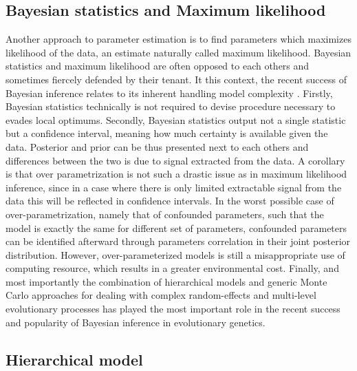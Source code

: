 \subsection{Bayesian statistics and {Maximum likelihood}}
Another approach to parameter estimation is to find parameters which maximizes likelihood of the data, an estimate naturally called maximum likelihood.
Bayesian statistics and maximum \gls{likelihood} are often opposed to each others and sometimes fiercely defended by their tenant.
It this context, the recent success of Bayesian inference relates to its inherent handling model complexity \citet{Lartillot2020}.
Firstly, Bayesian statistics technically is not required to devise procedure necessary to evades local optimums.
Secondly, Bayesian statistics output not a single statistic but a confidence interval, meaning how much certainty is available given the data.
Posterior and \gls{prior} can be thus presented next to each others and differences between the two is due to signal extracted from the data.
A corollary is that over parametrization is not such a drastic issue as in maximum \gls{likelihood} inference, since in a case where there is only limited extractable signal from the data this will be reflected in confidence intervals.
In the worst possible case of over-parametrization, namely that of confounded parameters, such that the model is exactly the same for different set of parameters, confounded parameters can be identified afterward through parameters correlation in their joint \gls{posterior} distribution.
However, over-parameterized models is still a misappropriate use of computing resource, which results in a greater environmental cost.
Finally, and most importantly the combination of hierarchical models and generic Monte Carlo approaches for dealing with complex random-effects and multi-level evolutionary processes has played the most important role in the recent success and popularity of Bayesian inference in evolutionary genetics.

\subsection{Hierarchical model}

